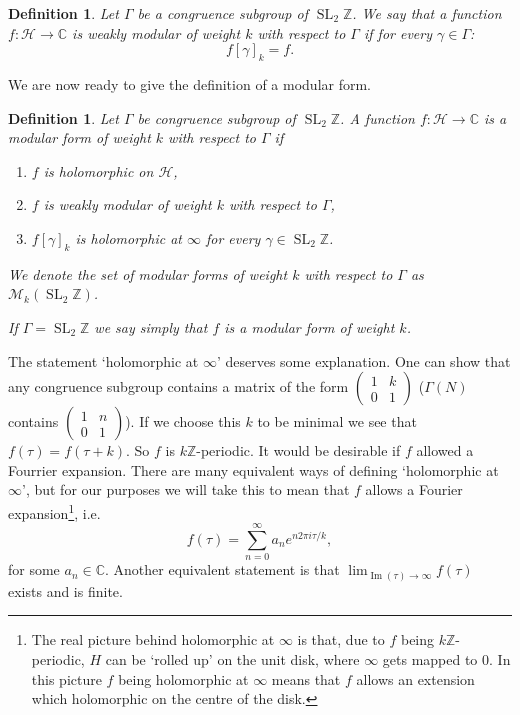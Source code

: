 \documentclass[titlepage,a4paper]{article}
\theoremstyle{theoremdd}
\theoremstyle{definitiondd}
\newtheorem{definition}[theorem]{Definition}
\theoremstyle{remarkdd}
\newcommand{\Z}{\mathbb{Z}}
\newcommand{\C}{\mathbb{C}}
\DeclareMathOperator{\im}{Im}
\DeclareMathOperator{\SL}{SL}
\begin{document}
\begin{definition}
	Let $\Gamma$ be a congruence subgroup of $\SL_2\Z$. We say that a function $f: \mathcal{H}  \to \C$ is \emph{weakly modular of weight $k$ with respect to $\Gamma$} if for every  $ \gamma \in \Gamma$:
	 \[
		 f[\gamma]_k = f 
	.\] 
\end{definition}

We are now ready to give the definition of a modular form. 
\begin{definition}\label{def:modular_form}
	Let $\Gamma$ be congruence subgroup of $\SL_2\Z$.
	A function $f: \mathcal{H}  \to \C$ is a \emph{modular form of weight $ k$ with respect to $\Gamma$} if 
	\begin{enumerate}
		\item $f$ is holomorphic on $\mathcal{H} $,
		\item $f$ is weakly modular of weight $k$ with respect to $\Gamma$, 
		\item $f[\gamma]_k$ is holomorphic at $\infty$ for every $\gamma \in \SL_2\Z$. 
	\end{enumerate}
	We denote the set of modular forms of weight $k$ with respect to $\Gamma$ as $\mathcal{M} _k(\SL_2\Z)$. 
	
	If $\Gamma = \SL_2\Z$ we say simply that $f$ is a modular form of weight $k$. 
\end{definition}
The statement `holomorphic at $\infty$' deserves some explanation. 
One can show that any congruence subgroup contains a matrix of the form $\begin{pmatrix} 1 & k \\ 0 & 1 \end{pmatrix} $ ($\Gamma(N)$ contains  $\begin{pmatrix} 1 & n \\ 0 & 1 \end{pmatrix} $). 
If we choose this $k$ to be minimal we see that $f(\tau) = f(\tau + k)$. 
So $f$ is $k\Z$-periodic. It would be desirable if $f$ allowed a Fourrier expansion.  
There are many equivalent ways of defining `holomorphic at $\infty$', but for our purposes we will take this to mean that $f$ allows a Fourier expansion\footnote{The real picture behind holomorphic at $\infty$ is that, due to $f$ being $k\Z$-periodic, $H$ can be `rolled up' on the unit disk, where $\infty$ gets mapped to 0. In this picture  $f$ being holomorphic at $\infty$ means that  $f$ allows an extension which holomorphic on the centre of the disk.}, i.e.\ \[
	f(\tau) = \sum_{n=0}^{\infty} a_n e^{n 2\pi i \tau / k}
,\]
for some $a_n \in \C$.
Another equivalent statement is that $\lim_{\im(\tau) \to \infty} f(\tau)$ exists and is finite.
\end{document}
